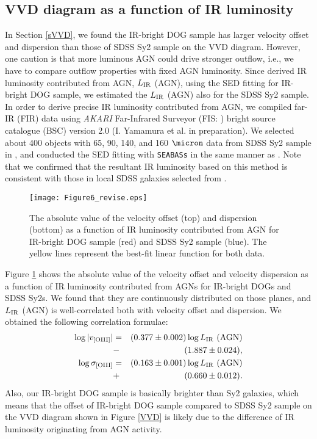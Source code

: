 \documentclass[twocolumn]{aastex6}
\begin{document}
\subsection{VVD diagram as a function of IR luminosity}
\label{VVD_IR}
In Section \ref{sVVD}, we found the IR-bright DOG sample has larger velocity offset and dispersion than those of SDSS Sy2 sample on the VVD diagram.
However, one caution is that more luminous AGN could drive stronger outflow, i.e., we have to compare outflow properties with fixed AGN luminosity.
Since \cite{Toba_16} derived IR luminosity contributed from AGN, $L_{\rm IR}$ (AGN), using the SED fitting for IR-bright DOG sample, we estimated the $L_{\rm IR}$ (AGN) also for the SDSS Sy2 sample.
In order to derive precise IR luminosity contributed from AGN, we compiled far-IR (FIR) data using {\it AKARI} \citep{Murakami} Far-Infrared Surveyor (FIS: \citealt{Kawada}) bright source catalogue (BSC) version 2.0  (I. Yamamura et al. in preparation).
We selected about 400 objects with 65, 90, 140, and 160 $\micron$ data from SDSS Sy2 sample in \cite{Woo}, and conducted the SED fitting with {\tt SEABASs} in the same manner as \cite{Toba_17b}.
Note that we confirmed that the resultant IR luminosity based on this method is consistent with those in local SDSS galaxies selected from \cite{Salim} \citep[see ][in detal]{Toba_17b}. 

   \begin{figure}
   \centering
   \texttt{[image: Figure6\_revise.eps]}
   \caption{The absolute value of the velocity offset (top) and dispersion (bottom) as a function of IR luminosity contributed from AGN for IR-bright DOG sample (red) and SDSS Sy2 sample (blue). The yellow lines represent the best-fit linear function for both data.}
   \label{vOIII_LAGN}
   \end{figure}
   
Figure \ref{vOIII_LAGN} shows the absolute value of the velocity offset and velocity dispersion as a function of IR luminosity contributed from AGNs for IR-bright DOGs and SDSS Sy2s.
We found that they are continuously distributed on those planes, and $L_{\rm IR}$ (AGN) is well-correlated both with velocity offset and dispersion.
We obtained the following correlation formulae:
\begin{eqnarray}
\log |v_{\rm [OIII]}| & = & (0.377 \pm 0.002) \log L_{\rm IR} \,\, {\rm (AGN)} \nonumber \\
			        & - & (1.887 \pm 0.024),  \\
\log \sigma_{\rm [OIII]} & = & (0.163 \pm 0.001) \log L_{\rm IR} \,\, {\rm (AGN)} \nonumber \\
			         & + &   (0.660 \pm 0.012).  
\end{eqnarray}
Also, our IR-bright DOG sample is basically brighter than Sy2 galaxies, which means that the offset of IR-bright DOG sample compared to SDSS Sy2 sample on the VVD diagram shown in Figure \ref{VVD} is likely due to the difference of IR luminosity originating from AGN activity.
\end{document}
